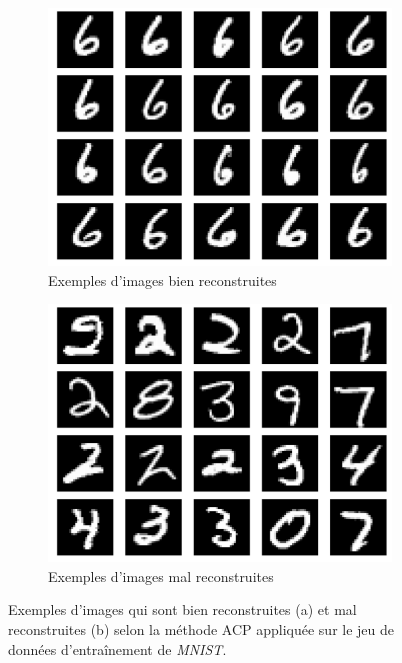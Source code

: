 \begin{figure}[H]
	\centering
	\begin{subfigure}{12cm}
		\centering\includegraphics[width=12cm]{images/smallest_errors_mnist}
		\caption{Exemples d'images bien reconstruites}
		\label{fig:mnist_acp_reconstructionsa}
	\end{subfigure}
	\begin{subfigure}{12cm}
		\centering\includegraphics[width=12cm]{images/biggest_errors_mnist}
		\caption{Exemples d'images mal reconstruites}
		\label{fig:mnist_acp_reconstructionsb}
	\end{subfigure}
	\caption{Exemples d'images qui sont bien reconstruites (a) et mal reconstruites (b) selon la méthode ACP appliquée sur le jeu de données d'entraînement de \textit{MNIST}.}
	\label{fig:mnist_acp_reconstructions}
\end{figure}

